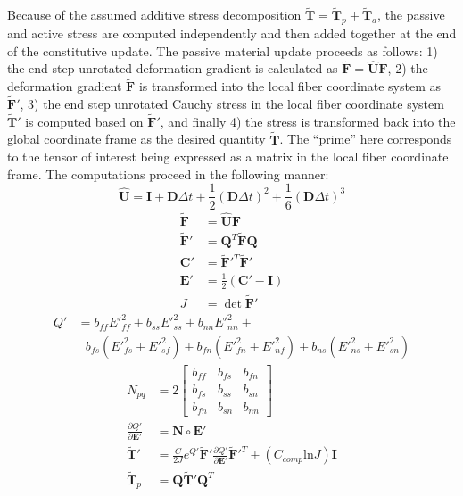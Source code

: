 Because of the assumed additive stress decomposition $\tilde{\bm{T}} = \tilde{\bm{T}}_p + \tilde{\bm{T}}_a$, the passive and active stress are computed independently and then added together at the end of the constitutive update. The passive material update proceeds as follows: 1) the end step unrotated deformation gradient is calculated as $\tilde{\bm{F}} = \hat{\bm{U}}\bm{F}$, 2) the deformation gradient $\tilde{\bm{F}}$ is transformed into the local fiber coordinate system as $\tilde{\bm{F}}'$, 3) the end step unrotated Cauchy stress in the local fiber coordinate system $\tilde{\bm{T}}'$ is computed based on $\tilde{\bm{F}}'$, and finally 4) the stress is transformed back into the global coordinate frame as the desired quantity $\tilde{\bm{T}}$. The ``prime'' here corresponds to the tensor of interest being expressed as a matrix in the local fiber coordinate frame. The computations proceed in the following manner:
\clearpage
\begin{equation}
\hat{\bm{U}} = \bm{I} + \bm{D}\Delta{t} + \frac{1}{2}(\bm{D}\Delta{t})^2 + \frac{1}{6}(\bm{D}\Delta{t})^3
\end{equation}
\begin{align}
\tilde{\bm{F}} &= \hat{\bm{U}}\bm{F} \\
\tilde{\bm{F}}' &= \bm{Q}^T\tilde{\bm{F}}\bm{Q} \\
\bm{C}' &= \tilde{\bm{F}}'^T \tilde{\bm{F}}' \\
\bm{E}' &= \frac{1}{2}(\bm{C}' - \bm{I}) \\
J  &= \det{\tilde{\bm{F}}'}
\end{align}
\begin{equation}
\begin{aligned}
Q' &= b_{ff} E'^2_{ff} + b_{ss} E'^2_{ss} + b_{nn} E'^2_{nn} + \\
&\text{\ \ \ }b_{fs}\left(E'^2_{fs} + E'^2_{sf}\right) + b_{fn}\left(E'^2_{fn} + E'^2_{nf}\right) + b_{ns}\left(E'^2_{ns} + E'^2_{sn}\right)
\end{aligned}
\end{equation}
\begin{align}
N_{pq} &= 2 \left[\begin{array} {ccc} b_{ff} & b_{fs} & b_{fn} \\ b_{fs} & b_{ss} & b_{sn} \\ b_{fn} & b_{sn} & b_{nn} \end{array} \right] \\
\frac{\partial Q'}{\partial \bm{E}'} &= \bm{N} \circ \bm{E}' \\
\tilde{\bm{T}}' &= \frac{C}{2J}e^{Q'}\tilde{\bm{F}}'\frac{\partial{Q'}}{\partial{\bm{E}'}}\tilde{\bm{F}}'^T + (C_{comp}\text{ln}J)\bm{I} \\
\tilde{\bm{T}}_p &= \bm{Q} \tilde{\bm{T}}' \bm{Q}^T
\end{align}
